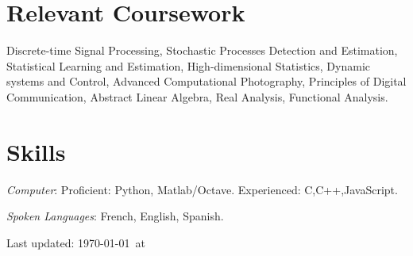 \documentclass[12pt,letterpaper]{article}
\def\HCode#1{}
\renewenvironment{itemize}{
  \begin{list}{}{
    \setlength{\leftmargin}{1.5em}
    \setlength{\itemsep}{0.25em}
    \setlength{\parskip}{0pt}
    \setlength{\parsep}{0.25em}
  }
}{
  \end{list}
}
\begin{document}
\section*{Relevant Coursework}

Discrete-time Signal Processing, Stochastic Processes
Detection and Estimation, Statistical Learning and Estimation, High-dimensional Statistics,
Dynamic systems and Control, Advanced Computational Photography, Principles
of Digital Communication, Abstract Linear Algebra, Real Analysis, Functional
Analysis.



\HCode{<a name="journalpapers"></a>}
%



%
%

%
%
%

\section*{Skills}

\begin{itemize}
  \item \emph{Computer}: Proficient: Python, Matlab/Octave. Experienced: C,C++,JavaScript.
  \item \emph{Spoken Languages}: French, English, Spanish.
\end{itemize}




\vfill
\HCode{<center>}
\begin{center}
    \begin{small}
        Last updated: \today\ at \currenttime
    \end{small}
\end{center}
\HCode{</center>}



\HCode{</div>} %
\HCode{</div>} %
\HCode{</div>} %
\end{document}
